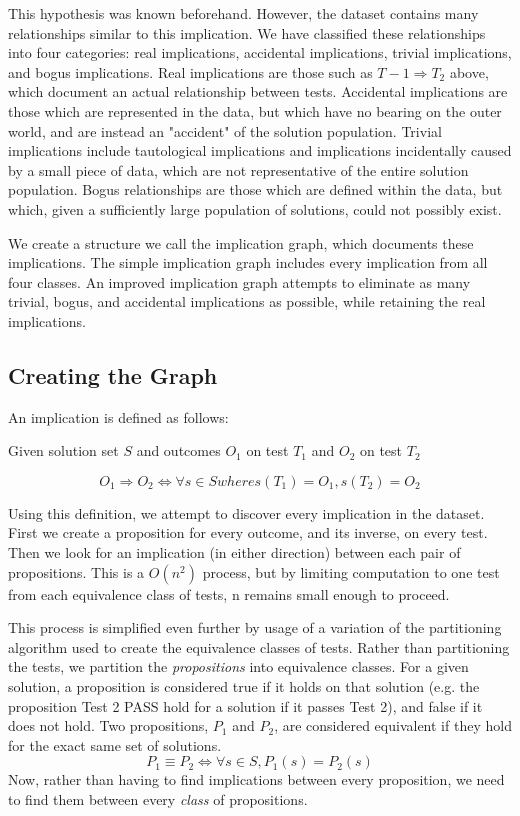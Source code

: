 \documentclass[11pt,twoside]{article}
\begin{document}
This hypothesis was known beforehand. However, the dataset contains many relationships similar to this implication. We have classified these relationships into four categories: real implications, accidental implications, trivial implications, and bogus implications. Real implications are those such as $T-1 \Rightarrow T_2$ above, which document an actual relationship between tests. Accidental implications are those which are represented in the data, but which have no bearing on the outer world, and are instead an "accident" of the solution population. Trivial implications include tautological implications and implications incidentally caused by a small piece of data, which are not representative of the entire solution population. Bogus relationships are those which are defined within the data, but which, given a sufficiently large population of solutions, could not possibly exist.

We create a structure we call the implication graph, which documents these implications. The simple implication graph includes every implication from all four classes. An improved implication graph attempts to eliminate as many trivial, bogus, and accidental implications as possible, while retaining the real implications.

\subsection{Creating the Graph}
An implication is defined as follows:

\centerline{Given solution set $S$ and outcomes $O_1$ on test $T_1$ and $O_2$ on test $T_2$}
$$O_1 \Rightarrow O_2 \iff \forall s \in S where s(T_1) = O_1, s(T_2) = O_2$$

Using this definition, we attempt to discover every implication in the dataset. First we create a proposition for every outcome, and its inverse, on every test. Then we look for an implication (in either direction) between each pair of propositions. This is a $O(n^2)$ process, but by limiting computation to one test from each equivalence class of tests, n remains small enough to proceed.

This process is simplified even further by usage of a variation of the partitioning algorithm used to create the equivalence classes of tests. Rather than partitioning the tests, we partition the \emph{propositions} into equivalence classes. For a given solution, a proposition is considered true if it holds on that solution (e.g. the proposition Test 2 PASS hold for a solution if it passes Test 2), and false if it does not hold. Two propositions, $P_1$ and $P_2$, are considered equivalent if they hold for the exact same set of solutions.
$$P_1 \equiv P_2 \iff \forall s \in S, P_1(s) = P_2(s)$$
Now, rather than having to find implications between every proposition, we need to find them between every \emph{class} of propositions.
\end{document}
